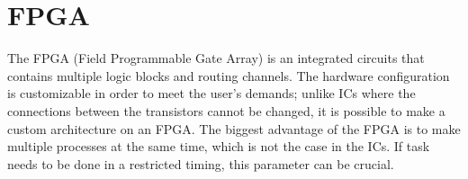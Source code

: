 \section{FPGA}


The FPGA (Field Programmable Gate Array) is an integrated circuits that contains multiple logic blocks and routing channels.
The hardware configuration is customizable in order to meet the user’s demands; unlike ICs where the connections between the transistors cannot be changed, it is possible to make a custom architecture on an FPGA.
The biggest advantage of the FPGA is to make multiple processes at the same time, which is not the case in the ICs. If task needs to be done in a restricted timing, this parameter can be crucial. 




\begin{comment}
FPGA are rather preferred over DSPs for digital signal processing when a high sample rate is needed. A normal DSP is designed to perform a specific task but can have limitations in the number of tasks that can be done per second. In today’s world, demands are increasing faster than the development of DSPs which means in many cases a single DSP is no longer efficient. One solution is to use multiple DSPs but architecture is more complex and an implementation of this type is not cost efficient. Using multiple devices forces the programmer to code some scheduling algorithms in order to achieve what is wanted which adds more overhead on the machine. 
In order to further understand why an FPGA is more efficient than the traditional DSP, the two modules need to be further explained.
\end{comment}
